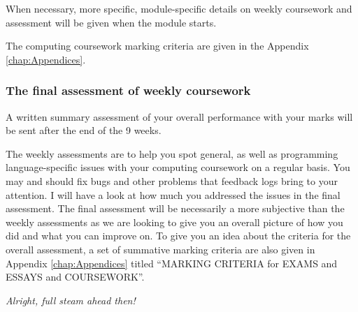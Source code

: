When necessary, more specific, module-specific details on weekly 
coursework and assessment will be given when the module 
starts. 

The computing coursework marking criteria are given in the Appendix 
\ref{chap:Appendices}. 

\subsubsection{The final assessment of weekly coursework}
A written summary assessment of your overall performance with your marks 
will be sent after the end of the 9 weeks. 

The weekly assessments are to help you spot general, as well as 
programming language-specific issues with your computing coursework on 
a regular basis. You may and should fix bugs and other problems that 
feedback logs bring to your attention. I will have a look at how much 
you addressed the issues in the final assessment. The final assessment 
will be necessarily a more subjective than the weekly assessments as we 
are looking to give you an overall picture of how you did and what you 
can improve on. To give you an idea about the criteria for the overall 
assessment, a set of summative marking criteria are also given in Appendix 
\ref{chap:Appendices} titled ``MARKING CRITERIA for EXAMS and ESSAYS 
and COURSEWORK''. 

\begin{center} \it
	Alright, full steam ahead then!
\end{center}
